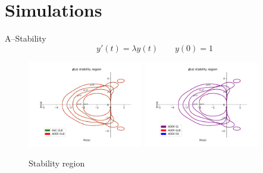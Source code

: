 \documentclass[aspectratio=169]{beamer}
\begin{document}
\section{Simulations}
\begin{frame}{A--Stability}
$$y'(t) = \lambda y(t)	\qquad y(0) = 1
$$
\begin{figure}[h] 
    \centering
    \includegraphics[width=0.45\textwidth, trim={30 20 30 20},clip]{stab_glb.pdf}
    \includegraphics[width=0.45\textwidth, trim={30 20 30 20},clip]{ader_all.pdf}
    \caption{Stability region}
    \label{fig:stab}
\end{figure}

\end{frame}
\end{document}
